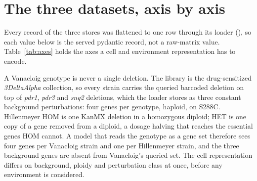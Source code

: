 
\section{The three datasets, axis by axis}
\label{sec:axes}

Every record of the three stores was flattened to one row through its loader
(), so each value below is the served pydantic record, not a
raw-matrix value.
Table~\ref{tab:axes} holds the axes a cell and environment representation has to encode.

\begin{table}[htbp]
\centering
\footnotesize
\caption{The cell, environment and readout axes of the three datasets, from the served
records. Each cell lists the distinct values with the number of records carrying them.
Vanacloig 2022 carries one value on every environment axis; Hillenmeyer varies medium,
temperature and duration inside the dataset.}
\label{tab:axes}

\end{table}

A Vanacloig genotype is never a single deletion. The library is the drug-sensitized
\emph{3DeltaAlpha} collection, so every strain carries the queried barcoded deletion on
top of \emph{pdr1}, \emph{pdr3} and \emph{snq2} deletions, which the loader stores as
three constant background perturbations: four genes per genotype, haploid, on S288C.
Hillenmeyer HOM is one KanMX deletion in a homozygous diploid; HET is one copy of a gene
removed from a diploid, a dosage halving that reaches the essential genes HOM cannot. A
model that reads the genotype as a gene set therefore sees four genes per Vanacloig
strain and one per Hillenmeyer strain, and the three background genes are absent from
Vanacloig's queried set. The cell representation differs on background, ploidy and
perturbation class at once, before any environment is considered.


